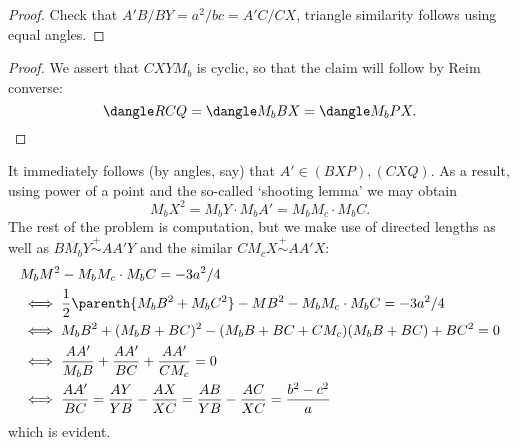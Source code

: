 \documentclass{seto}
\begin{document}
\begin{proof}
Check that $A'B/BY=a^2/bc=A'C/CX$, triangle similarity follows using
equal angles.
\end{proof}
\begin{proof}
We assert that $CXYM_b$ is cyclic, so that the claim will follow by Reim converse:
\[\dangle RCQ=\dangle M_bBX=\dangle M_bPX.\qedhere\]
\end{proof}
It immediately follows (by angles, say) that $A'\in(BXP),(CXQ)$.
As a result, using power of a point and the so-called `shooting lemma'
we may obtain
\[M_bX^2=M_bY\cdot M_bA'=M_bM_c\cdot M_bC.\]
The rest of the problem is computation, but we make use of directed lengths
as well as 
$BM_bY\overset+\sim AA'Y$ and the similar $CM_cX\overset+\sim AA'X$:
\begin{align*}
& M_bM^2-M_bM_c\cdot M_bC = -3a^2/4\\
&\iff\frac12\parenth{M_bB^2+M_bC^2}-MB^2-M_bM_c\cdot M_bC =-3a^2/4\\
&\iff M_bB^2+(M_bB+BC)^2-(M_bB+BC+CM_c)(M_bB+BC)+BC^2 =0\\
&\iff \frac{AA'}{M_bB}+\frac{AA'}{BC}+\frac{AA'}{CM_c} =0\\
&\iff \frac{AA'}{BC}
=\frac{AY}{YB}-\frac{AX}{XC}=\frac{AB}{YB}-\frac{AC}{XC}=\frac{b^2-c^2}a
\end{align*}
which is evident.
\end{document}
